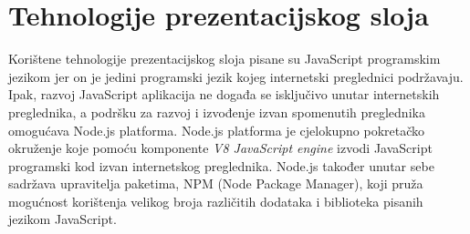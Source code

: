 \documentclass[times, utf8, zavrsni, numeric]{fer}
\begin{document}
		\section{Tehnologije prezentacijskog sloja}
		Korištene tehnologije prezentacijskog sloja pisane su JavaScript\cite{JavaScript2021} programskim jezikom jer on je jedini programski jezik kojeg internetski preglednici podržavaju. Ipak, razvoj JavaScript aplikacija ne događa se isključivo unutar internetskih preglednika, a podršku za razvoj i izvođenje izvan spomenutih preglednika omogućava Node.js\cite{Nodejs2021} platforma. Node.js platforma je cjelokupno pokretačko okruženje koje pomoću komponente \textit{V8 JavaScript engine}\cite{V82021}  izvodi JavaScript programski kod izvan internetskog preglednika. Node.js također unutar sebe sadržava upravitelja paketima, NPM\cite{NPM2021} (Node Package Manager), koji pruža mogućnost korištenja velikog broja različitih dodataka i biblioteka   pisanih jezikom JavaScript.
		
\end{document}
